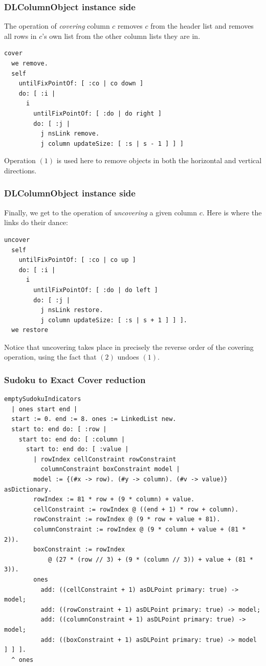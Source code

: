 \documentclass[10pt]{beamer}
\begin{document}
\begin{frame}[fragile]
\frametitle{DLColumnObject instance side}
The operation of \emph{covering} column $c$ removes $c$ from the header list and removes all rows in $c$'s own list from the other column lists they are in.
\vfill
\begin{verbatim}
cover
  we remove.
  self
    untilFixPointOf: [ :co | co down ]
    do: [ :i | 
      i
        untilFixPointOf: [ :do | do right ]
        do: [ :j | 
          j nsLink remove.
          j column updateSize: [ :s | s - 1 ] ] ]
\end{verbatim}
\vfill
Operation $(1)$ is used here to remove objects in both the horizontal and vertical directions.
\end{frame}

\begin{frame}[fragile]
\frametitle{DLColumnObject instance side}
Finally, we get to the operation of \textit{uncovering} a given column $c$. 
Here is where the links do their dance:
\vfill
\begin{verbatim}
uncover
  self
    untilFixPointOf: [ :co | co up ]
    do: [ :i | 
      i
        untilFixPointOf: [ :do | do left ]
        do: [ :j | 
          j nsLink restore.
          j column updateSize: [ :s | s + 1 ] ] ].
  we restore
\end{verbatim}
\vfill
Notice that uncovering takes place in precisely the reverse order of the 
covering operation, using the fact that $(2)$ undoes $(1)$.
\end{frame}

\begin{frame}[fragile]
\frametitle{Sudoku to Exact Cover reduction}
\begin{verbatim}
emptySudokuIndicators
  | ones start end |
  start := 0. end := 8. ones := LinkedList new.
  start to: end do: [ :row | 
    start to: end do: [ :column | 
      start to: end do: [ :value | 
        | rowIndex cellConstraint rowConstraint 
          columnConstraint boxConstraint model |
        model := {(#x -> row). (#y -> column). (#v -> value)} asDictionary.
        rowIndex := 81 * row + (9 * column) + value.
        cellConstraint := rowIndex @ ((end + 1) * row + column).
        rowConstraint := rowIndex @ (9 * row + value + 81).
        columnConstraint := rowIndex @ (9 * column + value + (81 * 2)).
        boxConstraint := rowIndex
            @ (27 * (row // 3) + (9 * (column // 3)) + value + (81 * 3)).
        ones
          add: ((cellConstraint + 1) asDLPoint primary: true) -> model;
          add: ((rowConstraint + 1) asDLPoint primary: true) -> model;
          add: ((columnConstraint + 1) asDLPoint primary: true) -> model;
          add: ((boxConstraint + 1) asDLPoint primary: true) -> model ] ] ].
  ^ ones
\end{verbatim}
\end{frame}
\end{document}
